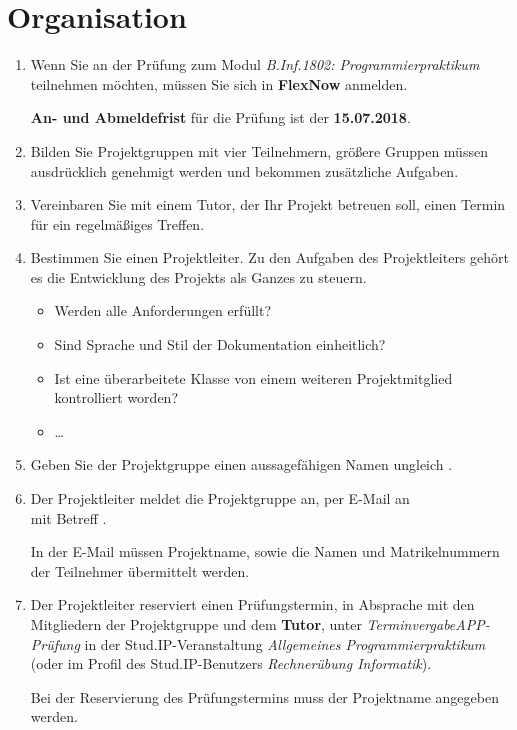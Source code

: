 \section*{Organisation}
\begin{enumerate}
\item Wenn Sie an der Prüfung zum Modul \emph{B.Inf.1802: Programmierpraktikum} teilnehmen möchten, müssen Sie sich in \textbf{FlexNow} anmelden.

\textbf{An- und Abmeldefrist} für die Prüfung ist der \textbf{15.07.2018}.
\item Bilden Sie Projektgruppen mit vier Teilnehmern, größere Gruppen müssen ausdrücklich genehmigt werden und bekommen zusätzliche Aufgaben.
\item Vereinbaren Sie mit einem Tutor, der Ihr Projekt betreuen soll, einen Termin für ein regelmäßiges Treffen.
\item Bestimmen Sie einen Projektleiter. Zu den Aufgaben des Projektleiters gehört es die Entwicklung des Projekts als Ganzes zu steuern.
\begin{itemize}
\item Werden alle Anforderungen erfüllt?
\item Sind Sprache und Stil der Dokumentation einheitlich?
\item Ist eine überarbeitete Klasse von einem weiteren Projektmitglied kontrolliert worden?
\item \dots
\end{itemize}
\item Geben Sie der Projektgruppe einen aussagefähigen Namen ungleich .
\item Der Projektleiter meldet die Projektgruppe an, per E-Mail an \\\href{mailto:brosenne@informatik.uni-goettingen.de}{} mit Betreff .

In der E-Mail müssen Projektname, sowie die Namen und Matrikelnummern der Teilnehmer übermittelt werden.
\item Der Projektleiter reserviert einen Prüfungstermin, in Absprache mit den Mitgliedern der Projektgruppe und dem \textbf{Tutor}, unter \textit{Terminvergabe\textrightarrow APP-Prüfung} in der Stud.IP-Veranstaltung \textit{Allgemeines Programmierpraktikum} (oder im Profil des Stud.IP-Benutzers \textit{Rechnerübung Informatik}).

Bei der Reservierung des Prüfungstermins muss der Projektname angegeben werden.
\end{enumerate}
